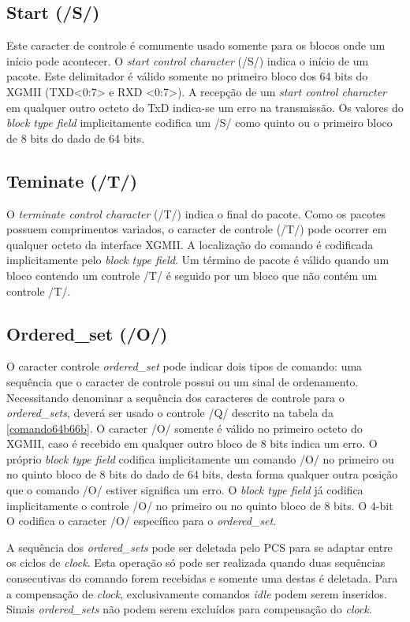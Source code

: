 \subsection{Start (/S/)}

Este caracter de controle é comumente usado somente para os blocos onde um início pode acontecer. O \textit{start control character} (/S/) indica o início de um pacote. Este delimitador é válido somente no primeiro bloco dos 64 bits do XGMII (TXD<0:7> e RXD <0:7>). A recepção de um \textit{start control character} em qualquer outro octeto do TxD indica-se um erro na transmissão. Os valores do \textit{block type field} implicitamente codifica um /S/ como quinto ou o primeiro bloco de 8 bits do dado de 64 bits. 

\subsection{Teminate (/T/)}

O \textit{terminate control character } (/T/) indica o final do pacote. Como os pacotes possuem comprimentos variados, o caracter de controle (/T/) pode ocorrer em qualquer octeto da interface XGMII. A localização do comando é codificada implicitamente pelo \textit{block type field}. Um término de pacote é válido quando um bloco contendo um controle /T/ é seguido por um bloco que não contém um controle /T/.

\subsection{Ordered\_set (/O/)}

O caracter controle \textit{ordered\_set} pode indicar dois tipos de comando: uma sequência que o caracter de controle possui ou um sinal de ordenamento. Necessitando denominar a sequência dos caracteres de controle para o \textit{ordered\_sets}, deverá ser usado o controle /Q/ descrito na tabela da \autoref{comando64b66b}. O caracter /O/ somente é válido no primeiro octeto do XGMII, caso é recebido em qualquer outro bloco de 8 bits indica um erro. O próprio \textit{block type field} codifica implicitamente um comando /O/ no primeiro ou no quinto bloco de 8 bits do dado de 64 bits, desta forma qualquer outra posição que o comando /O/ estiver significa um erro. O \textit{block type field} já codifica implicitamente o controle /O/ no primeiro ou no quinto bloco de 8 bits. O 4-bit O codifica o caracter /O/ específico para o \textit{ordered\_set}.

A sequência dos \textit{ordered\_sets} pode ser deletada pelo PCS para se adaptar entre os ciclos de \textit{clock}. Esta operação só pode ser realizada quando duas sequências consecutivas do comando forem recebidas e somente uma destas é deletada. Para a compensação de \textit{clock}, exclusivamente comandos \textit{idle} podem serem inseridos. Sinais \textit{ordered\_sets} não podem serem excluídos para compensação do \textit{clock}.

